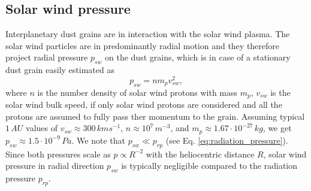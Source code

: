 \subsection{Solar wind pressure} \label{ch:solar_wind_pressure}

Interplanetary dust grains are in interaction with the solar wind plasma. The solar wind particles are in predominantly radial motion and they therefore project radial pressure $p_{sw}$ on the dust grains, which is in case of a stationary dust grain easily estimated \citep{shue1998magnetopause} as
\begin{equation}
    p_{sw} = n m_p v^2_{sw},  
\end{equation}
where $n$ is the number density of solar wind protons with mass $m_p$, $v_{sw}$ is the solar wind bulk speed, if only solar wind protons are considered and all the protons are assumed to fully pass ther momentum to the grain. Assuming typical $1 \, \si{AU}$ values of $v_{sw} \approx 300 \, \si{km s^{-1}}$, $n \approx 10^7 \, \si{m^{-3}}$, and $m_p \approx 1.67 \cdot 10^{-27} \, \si{kg}$, we get $p_{sw} \approx 1.5 \cdot 10^{-9} \, \si{Pa}$. We note that $p_{sw} \ll p_{rp}$ (see Eq. \ref{eq:radiation_pressure}). Since both pressures scale as $p \propto R^{-2}$ with the heliocentric distance $R$, solar wind pressure in radial direction $p_{sw}$ is typically negligible compared to the radiation pressure $p_{rp}$.

